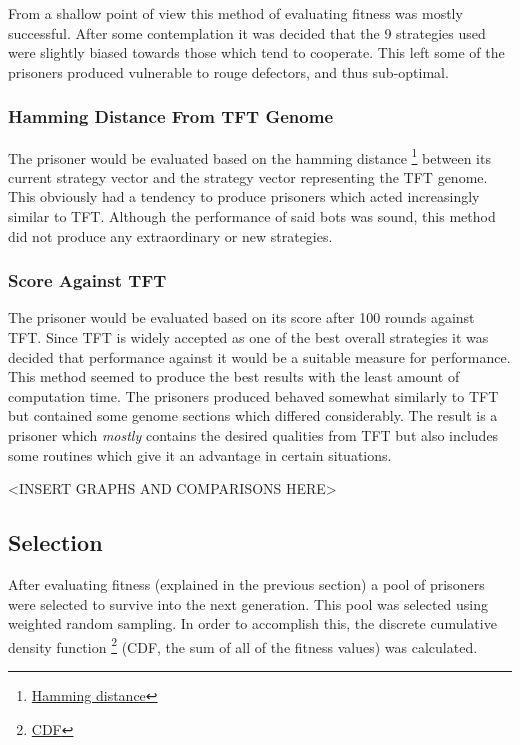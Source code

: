 \documentclass[12pt]{article}
\begin{document}
From a shallow point of view this method of evaluating fitness was mostly
successful.  After some contemplation it was decided that the
9 strategies used were slightly biased towards those which tend to cooperate.
This left some of the prisoners produced vulnerable to rouge defectors,
and thus sub-optimal.

\subsubsection{Hamming Distance From TFT Genome}
The prisoner would be evaluated based on the hamming distance
\footnote
{\href{https://en.wikipedia.org/wiki/Hamming_distance}{Hamming distance}}
between its current strategy vector and the strategy vector representing
the TFT genome.  This obviously had a tendency to produce prisoners which
acted increasingly similar to TFT.  Although the performance of said bots
was sound, this method did not produce any extraordinary or new strategies.

\subsubsection{Score Against TFT}

The prisoner would be evaluated based on its score after 100 rounds against
TFT.  Since TFT is widely accepted as one of the best overall strategies it was
decided that performance against it would be a suitable measure for performance.
This method seemed to produce the best results with the least
amount of computation time.  The prisoners produced behaved somewhat similarly
to TFT but contained some genome sections which differed considerably.  The result
is a prisoner which \textit{mostly} contains the desired qualities from TFT
but also includes some routines which give it an advantage in certain situations.

<INSERT GRAPHS AND COMPARISONS HERE>

\subsection{Selection}

After evaluating fitness (explained in the previous section) a pool of
prisoners were selected to survive into the next generation.  This pool was
selected using weighted random sampling.  In order to accomplish this, the
discrete cumulative density function 
\footnote{
\href{https://en.wikipedia.org/wiki/Cumulative_distribution_function}{CDF}
}
(CDF, the sum of all of the fitness values)
was calculated.
\end{document}
